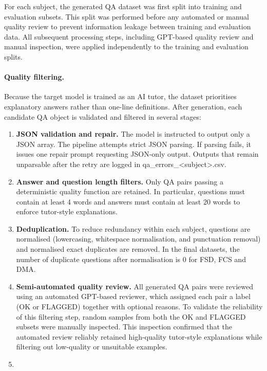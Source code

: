 For each subject, the generated QA dataset was first split into training and evaluation subsets.
This split was performed before any automated or manual quality review to prevent information leakage between training and evaluation data. All subsequent processing steps, including GPT-based quality review and manual inspection, were applied independently to the training and evaluation splits.

\paragraph{Quality filtering.}
Because the target model is trained as an AI tutor, the dataset prioritises explanatory answers rather than one-line definitions. After generation, each candidate QA object is validated and filtered in several stages:

\begin{enumerate}
    \item \textbf{JSON validation and repair.} The model is instructed to output only a JSON array. The pipeline attempts strict JSON parsing. If parsing fails, it issues one repair prompt requesting JSON-only output. Outputs that remain unparsable after the retry are logged in qa\_errors\_<subject>.csv.
    \item \textbf{Answer and question length filters.} Only QA pairs passing a deterministic quality function are retained. In particular, questions must contain at least 4 words and answers must contain at least 20 words to enforce tutor-style explanations.
    \item \textbf{Deduplication.} To reduce redundancy within each subject, questions are normalised (lowercasing, whitespace normalisation, and punctuation removal) and normalised exact duplicates are removed. In the final datasets, the number of duplicate questions after normalisation is 0 for FSD, FCS and DMA.
    \item \textbf{Semi-automated quality review.} All generated QA pairs were reviewed using an automated GPT-based reviewer, which assigned each pair a label (OK or FLAGGED) together with optional reasons. To validate the reliability of this filtering step, random samples from both the OK and FLAGGED subsets were manually inspected. This inspection confirmed that the automated review reliably retained high-quality tutor-style explanations while filtering out low-quality or unsuitable examples.
    \item
\end{enumerate}

